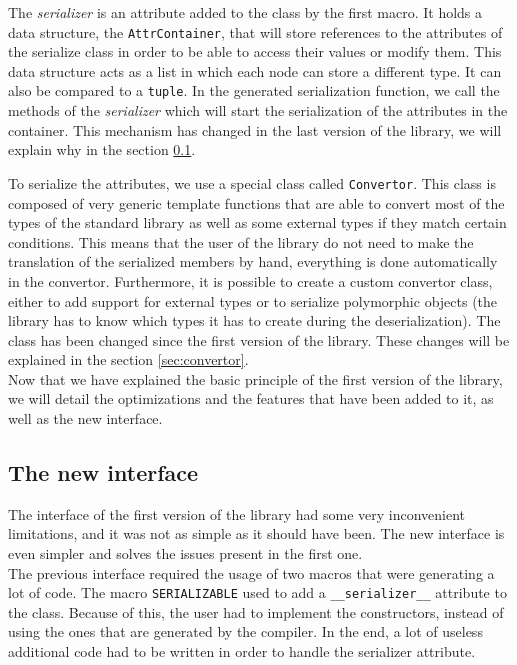 The \textit{serializer} is an attribute added to the class by the first macro.
It holds a data structure, the \texttt{AttrContainer}, that will store
references to the attributes of the serialize class in order to be able to
access their values or modify them. This data structure acts as a list in which
each node can store a different type. It can also be compared to a
\texttt{tuple}. In the generated serialization function, we call the methods of
the \textit{serializer} which will start the serialization of the attributes in
the container. This mechanism has changed in the last version of the library, we
will explain why in the section \ref{sec:sernewinterface}.

To serialize the attributes, we use a special class called \texttt{Convertor}.
This class is composed of very generic template functions that are able to
convert most of the types of the standard library as well as some external types
if they match certain conditions. This means that the user of the library do not
need to make the translation of the serialized members by hand, everything is
done automatically in the convertor. Furthermore, it is possible to create a
custom convertor class, either to add support for external types or to serialize
polymorphic objects (the library has to know which types it has to create during
the deserialization). The class has been changed since the first version of the
library. These changes will be explained in the section \ref{sec:convertor}.\\

Now that we have explained the basic principle of the first version of the
library, we will detail the optimizations and the features that have been added
to it, as well as the new interface.

\subsection{The new interface}
\label{sec:sernewinterface}

The interface of the first version of the library had some very inconvenient
limitations, and it was not as simple as it should have been. The new interface
is even simpler and solves the issues present in the first one.\\

The previous interface required the usage of two macros that were generating a
lot of code. The macro \texttt{SERIALIZABLE} used to add a
\texttt{\_\_serializer\_\_} attribute to the class. Because of this, the user
had to implement the constructors, instead of using the ones that are generated
by the compiler. In the end, a lot of useless additional code had to be written
in order to handle the serializer attribute.

